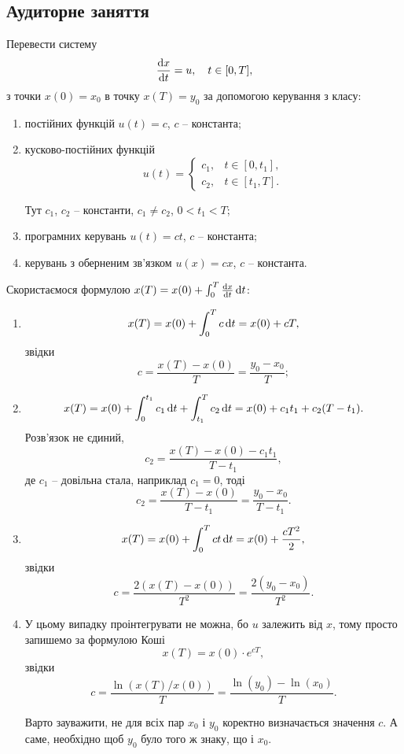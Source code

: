 \subsection{Аудиторне заняття}

\begin{problem}
	Перевести систему \[ \frac{\mathop{}\!\mathrm{d} x}{\mathop{}\!\mathrm{d} t} = u, \quad t \in [0, T], \] з точки $x (0) = x_0$ в точку $x (T) = y_0$ за допомогою керування з класу:
	\begin{enumerate}
		\item постійних функцій $u (t) = c$, $c$ -- константа;

		\item кусково-постійних функцій \[ u (t) = \begin{cases} c_1, & t \in [0, t_1], \\ c_2, & t \in [t_1, T]. \end{cases} \]

		Тут $c_1$, $c_2$ -- константи, $c_1 \ne c_2$, $0 < t_1 < T$;

		\item програмних керувань $u(t) = c t$, $c$ -- константа;

		\item керувань з оберненим зв'язком $u(x) = c x$, $c$ -- константа.
	\end{enumerate}
\end{problem}

\begin{solution}
	Скористаємося формулою $x (T) = x (0) + \int_0^T \frac{\mathop{}\!\mathrm{d} x}{\mathop{}\!\mathrm{d} t} \mathop{}\!\mathrm{d} t$:

	\begin{enumerate}
		\item \[x (T) = x (0) + \int_0^T c \mathop{}\!\mathrm{d} t = x (0) + c T,\] звідки \[c = \frac{x (T) - x (0)}{T} = \frac{y_0 - x_0}{T};\]

		\item \[ x (T) = x (0) + \int_0^{t_1} c_1 \mathop{}\!\mathrm{d} t + \int_{t_1}^T c_2 \mathop{}\!\mathrm{d} t = x (0) + c_1 t_1 + c_2 (T - t_1). \] Розв'язок не єдиний, \[ c_2 = \frac{x (T) - x (0) - c_1 t_1}{T - t_1}, \] де $c_1$ -- довільна стала, наприклад $c_1 = 0$, тоді \[ c_2 = \frac{x (T) - x (0)}{T - t_1} = \frac{y_0 - x_0}{T - t_1}. \]

		\item \[ x (T) = x (0) + \int_0^T c t \mathop{}\!\mathrm{d} t = x (0) + \frac{cT^2}{2}, \] звідки \[ c = \frac{2 (x (T) - x (0))}{T^2} = \frac{2 (y_0 - x_0)}{T^2}. \]

		\item У цьому випадку проінтегрувати не можна, бо $u$ залежить від $x$, тому просто запишемо за формулою Коші \[ x (T) = x (0) \cdot e^{c T}, \] звідки \[c = \frac{\ln(x (T) / x (0))}{T} = \frac{\ln(y_0) - \ln(x_0)}{T}. \]

		Варто зауважити, не для всіх пар $x_0$ і $y_0$ коректно визначається значення $c$. А саме, необхідно щоб $y_0$ було того ж знаку, що і $x_0$.
	\end{enumerate}
\end{solution}

